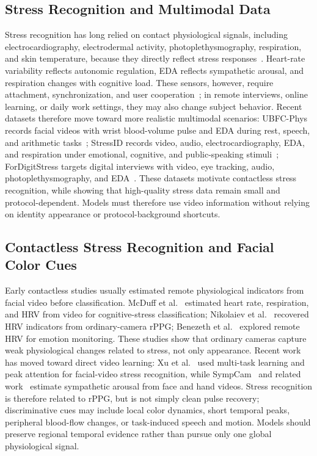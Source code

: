 \documentclass[runningheads]{llncs}
\begin{document}
\subsection{Stress Recognition and Multimodal Data}

Stress recognition has long relied on contact physiological signals, including electrocardiography, electrodermal activity, photoplethysmography, respiration, and skin temperature, because they directly reflect stress responses~\cite{healey2005drivingstress,schmidt2018wesad,schmidt2019wearableaffectreview}. Heart-rate variability reflects autonomic regulation, EDA reflects sympathetic arousal, and respiration changes with cognitive load. These sensors, however, require attachment, synchronization, and user cooperation~\cite{schmidt2018wesad,bota2022empathicschool}; in remote interviews, online learning, or daily work settings, they may also change subject behavior. Recent datasets therefore move toward more realistic multimodal scenarios: UBFC-Phys records facial videos with wrist blood-volume pulse and EDA during rest, speech, and arithmetic tasks~\cite{sabour2021ubfcphys}; StressID records video, audio, electrocardiography, EDA, and respiration under emotional, cognitive, and public-speaking stimuli~\cite{chaptoukaev2023stressid}; ForDigitStress targets digital interviews with video, eye tracking, audio, photoplethysmography, and EDA~\cite{heimerl2024fordigitstress}. These datasets motivate contactless stress recognition, while showing that high-quality stress data remain small and protocol-dependent. Models must therefore use video information without relying on identity appearance or protocol-background shortcuts.

\subsection{Contactless Stress Recognition and Facial Color Cues}

Early contactless studies usually estimated remote physiological indicators from facial video before classification. McDuff et al.~\cite{mcduff2014remote} estimated heart rate, respiration, and HRV from video for cognitive-stress classification; Nikolaiev et al.~\cite{nikolaiev2020noncontact} recovered HRV indicators from ordinary-camera rPPG; Benezeth et al.~\cite{benezeth2018remotehrv} explored remote HRV for emotion monitoring. These studies show that ordinary cameras capture weak physiological changes related to stress, not only appearance. Recent work has moved toward direct video learning: Xu et al.~\cite{xu2024mtasr} used multi-task learning and peak attention for facial-video stress recognition, while SympCam~\cite{braun2024sympcam} and related work~\cite{braun2023sympathetic} estimate sympathetic arousal from face and hand videos. Stress recognition is therefore related to rPPG, but is not simply clean pulse recovery; discriminative cues may include local color dynamics, short temporal peaks, peripheral blood-flow changes, or task-induced speech and motion. Models should preserve regional temporal evidence rather than pursue only one global physiological signal.
\end{document}
